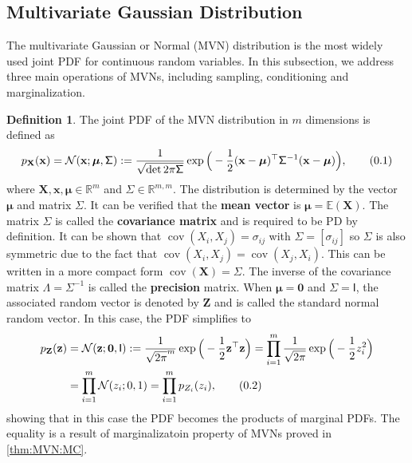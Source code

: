 \documentclass[10pt]{article}
\theoremstyle{definition}
\newtheorem{defn}{Definition}[section]
\newcommand\eqnum{\addtocounter{equation}{1}\tag{\arabic{section}.\arabic{equation}}}
\DeclareMathOperator{\cov}{cov}
\begin{document}
\subsection{Multivariate Gaussian Distribution}
The multivariate Gaussian or Normal (MVN) distribution is the most widely used joint PDF for continuous random variables. In this subsection, we address three main operations of MVNs, including sampling, conditioning and marginalization.
\begin{defn}
The joint PDF of the MVN distribution in $m$ dimensions is defined as
\begin{equation*}
p_{\mathbf{X}}(\mathbf{x}) = \mathcal{N}(\mathbf{x};\boldsymbol{\mu},\mathsf{\Sigma}) := 
\frac{1}{\sqrt{\det2\pi\mathsf{\Sigma}}}
\exp\Big(-\frac{1}{2}(\mathbf{x} - \boldsymbol{\mu})^{\top}\mathsf{\Sigma}^{-1}(\mathbf{x} - \boldsymbol{\mu})\Big),
\eqnum
\end{equation*}
where $\mathbf{X}, \mathbf{x}, \boldsymbol{\mu} \in \mathbb{R}^m$ and $\mathsf{\Sigma} \in \mathbb{R}^{m,m}$. The distribution is determined by the vector $\boldsymbol{\mu}$ and matrix $\mathsf{\Sigma}$. It can be verified that the \textbf{mean vector} is $\boldsymbol{\mu}=\mathbb{E}(\mathbf{X})$. The matrix $\mathsf{\Sigma}$ is called the \textbf{covariance matrix} and is required to be PD by definition. It can be shown that $\cov(X_i,X_j)=\mathsf{\sigma}_{ij}$ with $\mathsf{\Sigma}=[\sigma_{ij}]$ so $\mathsf{\Sigma}$ is also symmetric due to the fact that $\cov(X_i,X_j) = \cov(X_j, X_i)$. This can be written in a more compact form $\cov(\mathbf{X})=\mathsf{\Sigma}$. The inverse of the covariance matrix $\mathsf{\Lambda} = \mathsf{\Sigma}^{-1}$ is called the \textbf{precision} matrix. When $\boldsymbol{\mu} = \mathbf{0}$ and $\mathsf{\Sigma} = \mathsf{I}$, the associated random vector is denoted by $\mathbf{Z}$ and is called the standard normal  random vector. In this case, the PDF simplifies to
\begin{align*}
p_{\mathbf{Z}}(\mathbf{z}) &=  \mathcal{N}(\mathbf{z};\boldsymbol{0},\mathsf{I}) := \frac{1}{\sqrt{2\pi}^m}
\exp\Big(-\frac{1}{2}\mathbf{z}^{\top}\mathbf{z}\Big) = 
\prod_{i=1}^{m}\frac{1}{\sqrt{2\pi}}\exp\Big(-\frac{1}{2}z_i^2\Big) \\
&=\prod_{i=1}^{m}\mathcal{N}(z_i; 0, 1)=\prod_{i=1}^{m}p_{Z_i}(z_i),
\eqnum
\label{eq:RanVec:SN}
\end{align*}
showing that in this case the PDF becomes the products of marginal PDFs. The equality is a result of marginalizatoin property of MVNs proved in \cref{thm:MVN:MC}.
\end{defn}
\end{document}
